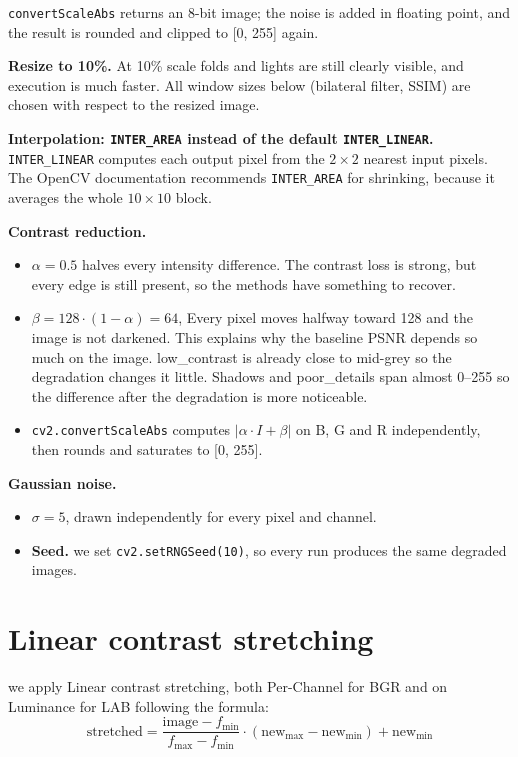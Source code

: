 \documentclass[11pt,a4paper]{article}
\begin{document}
\texttt{convertScaleAbs} returns an 8-bit image; the noise is added in floating point, and the result is rounded and clipped to [0, 255] again.

\textbf{Resize to 10\%.} At 10\% scale folds and lights are still clearly visible, and execution is much faster. All window sizes below (bilateral filter, SSIM) are chosen with respect to the resized image.

\textbf{Interpolation: \texttt{INTER\_AREA} instead of the default \texttt{INTER\_LINEAR}.} \texttt{INTER\_LINEAR} computes each output pixel from the $2\times2$ nearest input pixels. The OpenCV documentation recommends \texttt{INTER\_AREA} for shrinking, because it averages the whole $10\times10$ block.

\textbf{Contrast reduction.}
\begin{itemize}
  \item $\alpha = 0.5$ halves every intensity difference. The contrast loss is strong, but every edge is still present, so the methods have something to recover.
  \item $\beta = 128\cdot(1 - \alpha) = 64$, Every pixel moves halfway toward 128 and the image is not darkened.
  This explains why the baseline PSNR depends so much on the image. low\_contrast is already close to mid-grey so the degradation changes it little.
  Shadows and poor\_details span almost 0--255 so the difference after the degradation is more noticeable.
  \item \texttt{cv2.convertScaleAbs} computes $|\alpha\cdot I + \beta|$ on B, G and R independently, then rounds and saturates to [0, 255].
\end{itemize}

\textbf{Gaussian noise.}
\begin{itemize}
  \item $\sigma = 5$, drawn independently for every pixel and channel.
  \item \textbf{Seed.} we set \texttt{cv2.setRNGSeed(10)}, so every run produces the same degraded images.
\end{itemize}

\section{Linear contrast stretching}
we apply Linear contrast stretching, both Per-Channel for BGR and on Luminance for LAB
following the formula:
\[
\text{stretched} = \frac{\text{image} - f_{\min}}{f_{\max} - f_{\min}} \cdot (\text{new}_{\max} - \text{new}_{\min}) + \text{new}_{\min}
\]
\end{document}
